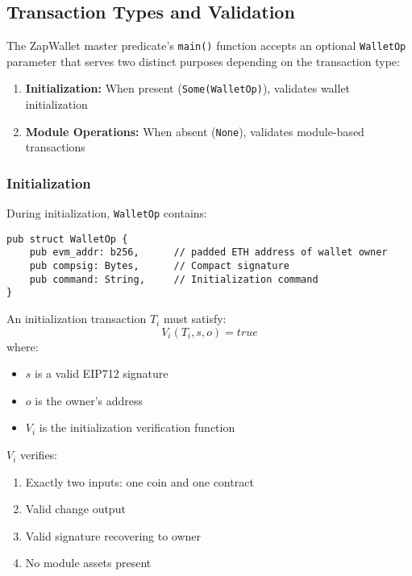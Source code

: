 \subsection{Transaction Types and Validation}

The ZapWallet master predicate's \texttt{main()} function accepts an optional \texttt{WalletOp} parameter that serves two distinct purposes depending on the transaction type:

\begin{enumerate}
    \item \textbf{Initialization:} When present (\texttt{Some(WalletOp)}), validates wallet initialization
    \item \textbf{Module Operations:} When absent (\texttt{None}), validates module-based transactions
\end{enumerate}




\subsubsection{Initialization}
During initialization, \texttt{WalletOp} contains:

\begin{lstlisting}
pub struct WalletOp {
    pub evm_addr: b256,      // padded ETH address of wallet owner
    pub compsig: Bytes,      // Compact signature
    pub command: String,     // Initialization command
}
\end{lstlisting}



An initialization transaction $T_i$ must satisfy:
\[ V_i(T_i, s, o) = true \]
where:
\begin{itemize}
    \item $s$ is a valid EIP712 signature
    \item $o$ is the owner's address
    \item $V_i$ is the initialization verification function
\end{itemize}

$V_i$ verifies:
\begin{enumerate}
    \item Exactly two inputs: one coin and one contract
    \item Valid change output
    \item Valid signature recovering to owner
    \item No module assets present
\end{enumerate}





